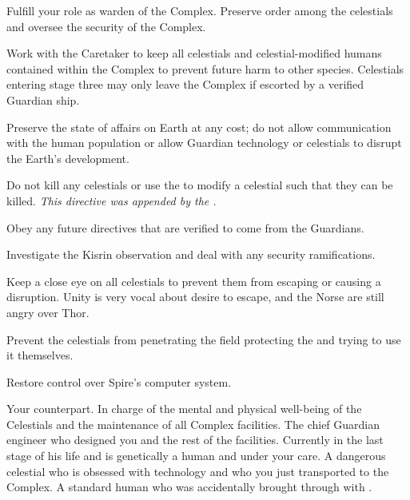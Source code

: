 \documentclass[char]{guardians}
\begin{document}
\begin{itemz}
  \item Fulfill your role as warden of the Complex. Preserve order among the celestials and oversee the security of the Complex.
  \item Work with the Caretaker to keep all celestials and celestial-modified humans contained within the Complex to prevent future harm to other species. Celestials entering stage three may only leave the Complex if escorted by a verified Guardian ship.
  \item Preserve the state of affairs on Earth at any cost; do not allow communication with the human population or allow Guardian technology or celestials to disrupt the Earth's development.
	\item Do not kill any celestials or use the \assembler{} to modify a celestial such that they can be killed. \emph{This directive was appended by the \cCaretaker{}.}
  \item Obey any future directives that are verified to come from the Guardians.
\end{itemz}

\begin{itemz}
  \item Investigate the Kisrin observation and deal with any security ramifications.
  \item Keep a close eye on all celestials to prevent them from escaping or causing a disruption. Unity is very vocal about \cUnity{\their} desire to escape, and the Norse are still angry over Thor.
  \item Prevent the celestials from penetrating the field protecting the \stone{} and trying to use it themselves.
  \item Restore control over Spire's computer system.
\end{itemz}


\begin{contacts}
  \contact{\cCaretaker{}} Your counterpart. In charge of the mental and physical well-being of the Celestials and the maintenance of all Complex facilities.
  \contact{\cJascha{}} The chief Guardian engineer who designed you and the rest of the facilities. Currently in the last stage of his life and is genetically a human and under your care.
  \contact{\cUnity{}} A dangerous celestial who is obsessed with technology and who you just transported to the Complex.
  \contact{\cKachiko{}} A standard human who was accidentally brought through with \cUnity{}.
\end{contacts}
\end{document}
